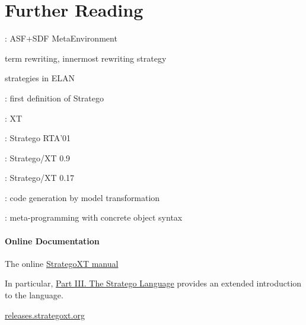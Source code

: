 \section{Further Reading}

\cite{Klint93,BrandDHJJKKMOSVVV01}: ASF+SDF MetaEnvironment

term rewriting, innermost rewriting strategy

strategies in ELAN \cite{BorovanskyKKMV96,BorovanskyKKMR98}

\cite{VisserBT98}: first definition of Stratego

\cite{JongeVV01}: XT

\cite{Visser01}: Stratego RTA'01

\cite{Visser03}: Stratego/XT 0.9

\cite{BravenboerKVV08}: Stratego/XT 0.17

\cite{HemelKGV10}: code generation by model transformation


\cite{Visser02}: meta-programming with concrete object syntax

\paragraph{Online Documentation}

The
online \href{http://releases.strategoxt.org/strategoxt-manual/strategoxt-manual-0.17pre18721-8c3vml4h/manual/
}{StrategoXT manual} \cite{StrategoXTReferenceManual}

In particular, 
\href{http://releases.strategoxt.org/strategoxt-manual/strategoxt-manual-0.17pre18721-8c3vml4h/manual/chunk-chapter/stratego-language.html}{Part
III. The Stratego Language} provides an extended introduction to the language.


\href{http://releases.strategoxt.org}{releases.strategoxt.org}

